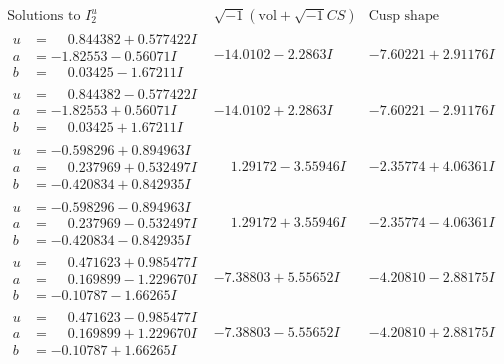 \documentclass[1p]{elsarticle_modified}
\theoremstyle{definition}
\newcommand{\I}{\sqrt{-1}}
\begin{document}
$$\begin{array}{c|c|c}  
\text{Solutions to }I^u_{2}& \I (\text{vol} + \sqrt{-1}CS) & \text{Cusp shape}\\
 \hline 
\begin{aligned}
u &= \phantom{-}0.844382 + 0.577422 I \\
a &= -1.82553 - 0.56071 I \\
b &= \phantom{-}0.03425 - 1.67211 I\end{aligned}
 & -14.0102 - 2.2863 I & -7.60221 + 2.91176 I \\ \hline\begin{aligned}
u &= \phantom{-}0.844382 - 0.577422 I \\
a &= -1.82553 + 0.56071 I \\
b &= \phantom{-}0.03425 + 1.67211 I\end{aligned}
 & -14.0102 + 2.2863 I & -7.60221 - 2.91176 I \\ \hline\begin{aligned}
u &= -0.598296 + 0.894963 I \\
a &= \phantom{-}0.237969 + 0.532497 I \\
b &= -0.420834 + 0.842935 I\end{aligned}
 & \phantom{-}1.29172 - 3.55946 I & -2.35774 + 4.06361 I \\ \hline\begin{aligned}
u &= -0.598296 - 0.894963 I \\
a &= \phantom{-}0.237969 - 0.532497 I \\
b &= -0.420834 - 0.842935 I\end{aligned}
 & \phantom{-}1.29172 + 3.55946 I & -2.35774 - 4.06361 I \\ \hline\begin{aligned}
u &= \phantom{-}0.471623 + 0.985477 I \\
a &= \phantom{-}0.169899 - 1.229670 I \\
b &= -0.10787 - 1.66265 I\end{aligned}
 & -7.38803 + 5.55652 I & -4.20810 - 2.88175 I \\ \hline\begin{aligned}
u &= \phantom{-}0.471623 - 0.985477 I \\
a &= \phantom{-}0.169899 + 1.229670 I \\
b &= -0.10787 + 1.66265 I\end{aligned}
 & -7.38803 - 5.55652 I & -4.20810 + 2.88175 I \\ \hline\begin{aligned}

\end{aligned}
\end{array}$$
\end{document}
